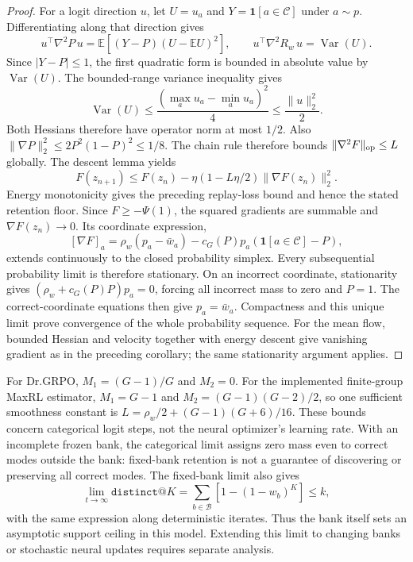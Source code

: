 \begin{proof}
For a logit direction $u$, let $U=u_a$ and $Y=\mathbf1[a\in\mathcal C]$
under $a\sim p$. Differentiating along that direction gives
\[
 u^\top\nabla^2P\,u
 =\mathbb E[(Y-P)(U-\mathbb EU)^2],\qquad
 u^\top\nabla^2R_w\,u=\operatorname{Var}(U).
\]
Since $|Y-P|\le1$, the first quadratic form is bounded in absolute
value by $\operatorname{Var}(U)$. The bounded-range variance inequality gives
\[
 \operatorname{Var}(U)\le\frac{(\max_a u_a-\min_a u_a)^2}{4}
 \le\frac{\lVert u\rVert_2^2}{2}.
\]
Both Hessians therefore have operator norm at most $1/2$.
Also $\lVert\nabla P\rVert_2^2\le2P^2(1-P)^2\le1/8$.
The chain rule therefore bounds $\lVert\nabla^2F\rVert_{\rm op}\le L$
globally. The descent lemma yields
\[
 F(z_{n+1})\le F(z_n)
 -\eta(1-L\eta/2)\lVert\nabla F(z_n)\rVert_2^2.
\]
Energy monotonicity gives the preceding replay-loss bound and hence the
stated retention floor. Since $F\ge-\Psi(1)$, the squared gradients are
summable and $\nabla F(z_n)\to0$. Its coordinate expression,
\[
 [\nabla F]_a=\rho_w(p_a-\bar w_a)
 -c_G(P)p_a(\mathbf1[a\in\mathcal C]-P),
\]
extends continuously to the closed probability simplex. Every subsequential
probability limit is therefore stationary. On an incorrect coordinate,
stationarity gives $(\rho_w+c_G(P)P)p_a=0$, forcing all incorrect mass to
zero and $P=1$. The correct-coordinate equations then give $p_a=\bar w_a$.
Compactness and this unique limit prove convergence of the whole probability
sequence. For the mean flow, bounded Hessian and velocity together with
energy descent give vanishing gradient as in the preceding corollary;
the same stationarity argument applies.
\end{proof}

For Dr.GRPO, $M_1=(G-1)/G$ and $M_2=0$. For the implemented finite-group
MaxRL estimator, $M_1=G-1$ and $M_2=(G-1)(G-2)/2$, so one sufficient smoothness
constant is $L=\rho_w/2+(G-1)(G+6)/16$. These bounds concern categorical logit
steps, not the neural optimizer's learning rate. With an incomplete frozen
bank, the categorical limit assigns zero mass even to correct modes outside
the bank: fixed-bank retention is not a guarantee of discovering or preserving
all correct modes. The fixed-bank limit also gives
\[
 \lim_{t\to\infty}\texttt{distinct@}K
 =\sum_{b\in\mathcal B}[1-(1-w_b)^K]\le k,
\]
with the same expression along deterministic iterates. Thus the bank itself
sets an asymptotic support ceiling in this model. Extending this limit to
changing banks or stochastic neural updates requires separate analysis.

